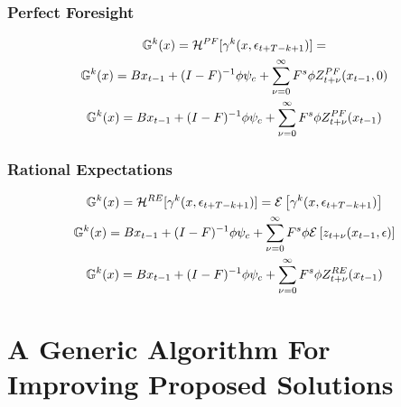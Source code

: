 \documentclass[tikz]{beamer}
\begin{document}
\begin{frame}
\frametitle{Perfect Foresight}




\begin{gather}
\XZFunc^{k}(x)=     \mathcal{H}^{PF}[\xzFunc^{k}(x,\epsilon_{t+T-k+1})]=\\
\XZFunc^{k}(x)=\EsumLinPart +   \EsumZPartZero\\
 \XZFunc^{k}(x)=\EsumLinPart + \EsumCapZPart{PF}
\end{gather}

\end{frame}
\begin{frame}
  
 \frametitle{Rational Expectations}

 \begin{gather}
 \XZFunc^{k}(x)=     \mathcal{H}^{RE}[\xzFunc^{k}(x,\epsilon_{t+T-k+1})]=
 \expct{\xzFunc^{k}(x,\epsilon_{t+T-k+1})}\\
  \XZFunc^{k}(x)=\EsumLinPart + \EsumZPartEpsilon\\
 \XZFunc^{k}(x)=\EsumLinPart + \EsumCapZPart{RE}
 \end{gather}

\end{frame}

\section{A Generic Algorithm For Improving Proposed Solutions}
\end{document}
